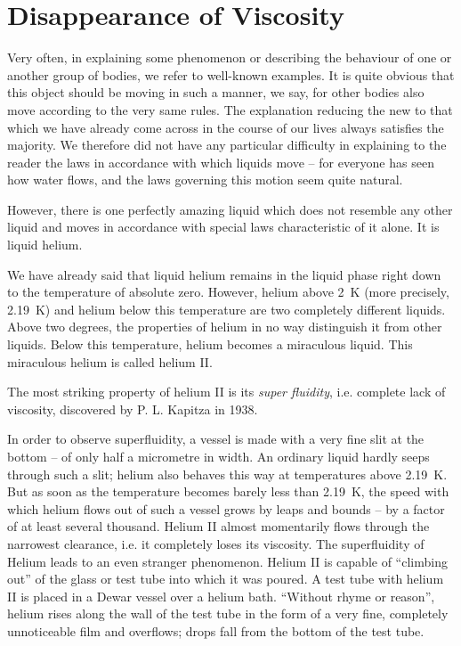 \section{Disappearance of Viscosity}

Very often, in explaining some phenomenon or describ­ing the behaviour of one or another group of bodies, we refer to well-known examples. It is quite obvious that this object should be moving in such a manner, we say, for other bodies also move according to the very same rules. The explanation reducing the new to that which we have already come across in the course of our lives always satisfies the majority. We therefore did not have any particular difficulty in explaining to the reader the laws in accordance with which liquids move -- for everyone has seen how water flows, and the laws governing this motion seem quite natural.

However, there is one perfectly amazing liquid which does not resemble any other liquid and moves in accor­dance with special laws characteristic of it alone. It is liquid helium.

We have already said that liquid helium remains in the liquid phase right down to the temperature of absolute zero. However, helium above \SI{2}{\kelvin} (more precisely, \SI{2.19}{\kelvin}) and helium below this temperature are two completely different liquids. Above two degrees, the properties of helium in no way distinguish it from other liquids. Below this temperature, helium becomes a miraculous liquid. This miraculous helium is called helium II.

The most striking property of helium II is its \emph{super­ fluidity}, i.e. complete lack of viscosity, discovered by P. L. Kapitza in 1938.

In order to observe superfluidity, a vessel is made with a very fine slit at the bottom -- of only half a micrometre in width. An ordinary liquid hardly seeps through such a slit; helium also behaves this way at temperatures above \SI{2.19}{\kelvin}. But as soon as the temperature becomes barely less than \SI{2.19}{\kelvin}, the speed with which helium flows out of such a vessel grows by leaps and bounds -- by a factor of at least several thousand. Helium II almost momentarily flows through the narrowest clearance, i.e. it com­pletely loses its viscosity. The superfluidity of Helium leads to an even stranger phenomenon. Helium II is ca­pable of ``climbing out'' of the glass or test tube into which it was poured. A test tube with helium II is placed in a Dewar vessel over a helium bath. ``Without rhyme or reason'', helium rises along the wall of the test tube in the form of a very fine, completely unnoticeable film and overflows; drops fall from the bottom of the test tube.

